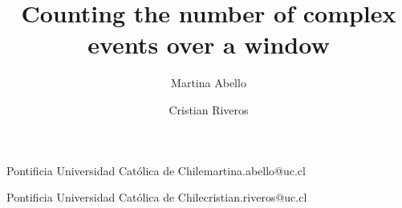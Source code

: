 

\title{Counting the number of complex events over a window} 

\author{Martina Abello}{Pontificia Universidad Católica de Chile}{martina.abello@uc.cl}{}{}
\author{Cristian Riveros}{Pontificia Universidad Católica de Chile}{cristian.riveros@uc.cl}{}{}







\hideLIPIcs  %


